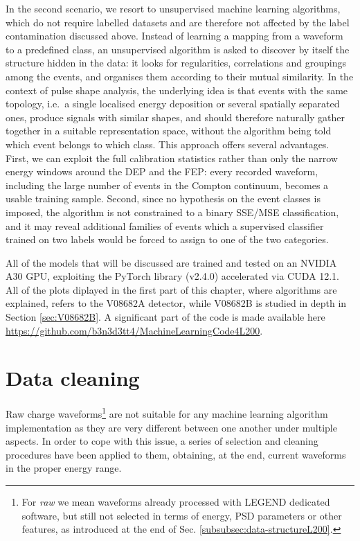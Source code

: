 In the second scenario, we resort to unsupervised machine learning algorithms, which do not require labelled datasets and are therefore not affected by the label contamination discussed above. Instead of learning a mapping from a waveform to a predefined class, an unsupervised algorithm is asked to discover by itself the structure hidden in the data: it looks for regularities, correlations and groupings among the events, and organises them according to their mutual similarity. In the context of pulse shape analysis, the underlying idea is that events with the same topology, i.e.\ a single localised energy deposition or several spatially separated ones, produce signals with similar shapes, and should therefore naturally gather together in a suitable representation space, without the algorithm being told which event belongs to which class. This approach offers several advantages. First, we can exploit the full calibration statistics rather than only the narrow energy windows around the \ac{DEP} and the \ac{FEP}: every recorded waveform, including the large number of events in the Compton continuum, becomes a usable training sample. Second, since no hypothesis on the event classes is imposed, the algorithm is not constrained to a binary \ac{SSE}/\ac{MSE} classification, and it may reveal additional families of events which a supervised classifier trained on two labels would be forced to assign to one of the two categories.

All of the models that will be discussed are trained and tested on an NVIDIA A30 GPU, exploiting the PyTorch library (v2.4.0) accelerated via CUDA 12.1. All of the plots diplayed in the first part of this chapter, where algorithms are explained, refers to the V08682A detector, while V08682B is studied in depth in Section \ref{sec:V08682B}. A significant part of the code is made available here \url{https://github.com/b3n3d3tt4/MachineLearningCode4L200}.

\section{Data cleaning}
\label{sec:data-cleaning}
Raw charge waveforms\footnote{For \textit{raw} we mean waveforms already processed with LEGEND dedicated software, but still not selected in terms of energy, \ac{PSD} parameters or other features, as introduced at the end of Sec. \ref{subsubsec:data-structureL200}.} are not suitable for any machine learning algorithm implementation as they are very different between one another under multiple aspects. In order to cope with this issue, a series of selection and cleaning procedures have been applied to them, obtaining, at the end, current waveforms in the proper energy range.


